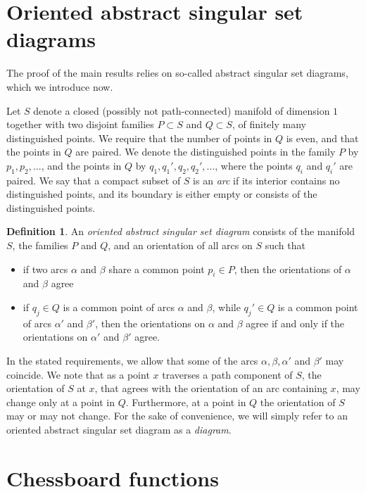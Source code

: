 \documentclass[12pt]{amsart}
\theoremstyle{definition}
\newtheorem{definition}[theorem]{Definition}
\begin{document}
\section{Oriented abstract singular set diagrams}

The proof of the main results relies on so-called abstract singular set diagrams, which we introduce now.

Let $S$ denote a closed (possibly not path-connected) manifold of dimension $1$  together with two disjoint families $P\subset S$ and $Q\subset S$,  of finitely many distinguished points. We require that the number of points in $Q$ is even, and that the points in $Q$ are paired.  We denote the distinguished points in the family $P$ by $p_1, p_2, ...$, and the points in $Q$ by $q_1, q_1', q_2, q_2', ...$, where the points $q_i$ and $q_i'$ are paired.  We say that a compact subset of $S$ is an \emph{arc} if its interior contains no distinguished points, and its boundary is either empty or consists of the distinguished points.  
\begin{definition}
An \emph{oriented abstract singular set diagram} consists of the manifold $S$, the families $P$ and $Q$, and an orientation of all arcs on $S$ such that 
\begin{itemize}
\item if two arcs $\alpha$ and $\beta$ share a common point $p_i\in P$, then the orientations of $\alpha$ and $\beta$ agree
\item if $q_j \in Q$ is a common point of arcs $\alpha$ and $\beta$, while $q_j' \in Q$ is a common point of arcs $\alpha'$ and $\beta'$, then the orientations on $\alpha$ and $\beta$ agree if and only if the orientations on $\alpha'$ and $\beta'$ agree. 
\end{itemize}
\end{definition}

In the stated requirements,  we allow that some of the arcs $\alpha, \beta, \alpha'$ and $\beta'$ may coincide.  We note that as a point $x$ traverses a path component of $S$, the orientation of $S$ at $x$,  that agrees with the orientation of an arc containing $x$,  may change only at a point in $Q$. Furthermore, at a point in $Q$ the orientation of $S$ may or may not change.  For the sake of convenience, we will simply refer to an oriented abstract singular set diagram as a \emph{diagram}. 

\section{Chessboard functions}
\end{document}
